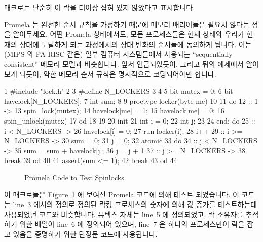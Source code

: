  매크로는 단순히 이 락을 더이상 잡혀 있지 않았다고
표시합니다.

Promela 는 완전한 순서 규칙을 가정하기 때문에 메모리 배리어들은 필요치 않다는
점을 알아두세요.
어떤 Promela 상태에서도, 모든 프로세스들은 현재 상태와 우리가 현재의 상태에
도달하게 되는 과정에서의 상태 변화의 순서들에 동의하게 됩니다.
이는 (MIPS 와 PA-RISC 같은) 일부 컴퓨터 시스템들에서 사용되는 ``sequentially
consistent'' 메모리 모델과 비슷합니다.
앞서 언급되었듯이, 그리고 뒤의 예제에서 알아보게 되듯이, 약한 메모리 순서
규칙은 명시적으로 코딩되어야만 합니다.
\iffalse

The \co{spin_unlock()} macro simply marks the lock as no
longer held.

Note that memory barriers are not needed because Promela assumes
full ordering.
In any given Promela state, all processes agree on both the current
state and the order of state changes that caused us to arrive at
the current state.
This is analogous to the ``sequentially consistent'' memory model
used by a few computer systems (such as MIPS and PA-RISC).
As noted earlier, and as will be seen in a later example,
weak memory ordering must be explicitly coded.
\fi

{ \scriptsize
\begin{verbbox}
  1 #include "lock.h"
  2
  3 #define N_LOCKERS 3
  4
  5 bit mutex = 0;
  6 bit havelock[N_LOCKERS];
  7 int sum;
  8
  9 proctype locker(byte me)
 10 {
 11   do
 12   :: 1 ->
 13     spin_lock(mutex);
 14     havelock[me] = 1;
 15     havelock[me] = 0;
 16     spin_unlock(mutex)
 17   od
 18 }
 19
 20 init {
 21   int i = 0;
 22   int j;
 23
 24 end:  do
 25   :: i < N_LOCKERS ->
 26     havelock[i] = 0;
 27     run locker(i);
 28     i++
 29   :: i >= N_LOCKERS ->
 30     sum = 0;
 31     j = 0;
 32     atomic {
 33       do
 34       :: j < N_LOCKERS ->
 35         sum = sum + havelock[j];
 36         j = j + 1
 37       :: j >= N_LOCKERS ->
 38         break
 39       od
 40     }
 41     assert(sum <= 1);
 42     break
 43   od
 44 }
\end{verbbox}
}
\begin{figure}[tb]
\centering
\theverbbox
\caption{Promela Code to Test Spinlocks}
\label{fig:analysis:Promela Code to Test Spinlocks}
\end{figure}

이 매크로들은
Figure~\ref{fig:analysis:Promela Code to Test Spinlocks}
에 보여진 Promela 코드에 의해 테스트 되었습니다.
이 코드는 line~3 에서의  정의로 정의된 락킹 프로세스의 숫자에
의해 값 증가를 테스트하는데 사용되었던 코드와 비슷합니다.
뮤텍스 자체는 line~5 에 정의되었고, 락 소유자를 추적하기 위한 배열이 line~6 에
정의되어 있으며, line~7 은 하나의 프로세스만이 락을 잡고 있음을 증명하기 위한
단정문 코드에 사용됩니다.


